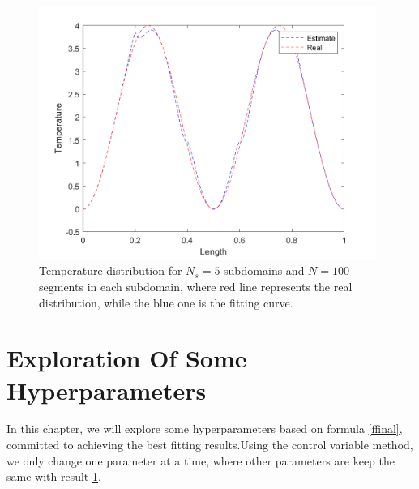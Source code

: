 \documentclass{article}
\begin{document}
    \begin{figure}[H]
        \centering %
        \includegraphics[width=11cm]{pic/se3_n=500.png} %
        \caption{Temperature distribution for $N_s=5$ subdomains and $N=100$ segments in each subdomain, where red line represents the real distribution, while the blue one is the fitting curve.} %
        \label{se_500}
    \end{figure}    
\section{Exploration Of Some Hyperparameters}
In this chapter, we will explore some hyperparameters based on formula \ref{ffinal}, committed to achieving the best fitting results.Using the control variable method, we only change one parameter at a time, where other parameters are keep the same with result \ref{se_500}.
\end{document}
